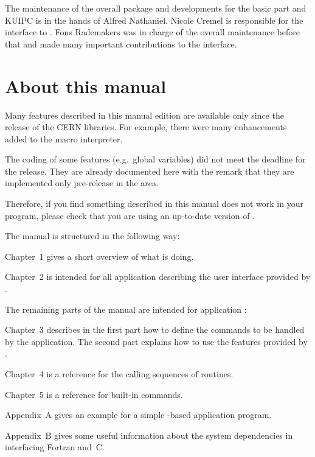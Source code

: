 The maintenance of the overall package and developments for the basic
part and KUIPC is in the hands of Alfred Nathaniel.
Nicole Cremel is responsible for the \KUIP{} interface to \OSFMotif{}.
Fons Rademakers was in charge of the overall maintenance before
that and made many important contributions to the \KUIPMotif{} interface.


\section*{About this manual}
 
Many features described in this manual edition are available only since the
 release of the CERN libraries.
For example, there were many enhancements added to the macro interpreter.

The coding of some features (e.g.\ global variables) did not meet the
deadline for the  release.  
They are already documented here with the remark that they are
implemented only  pre-release in the  area.

Therefore, if you find something described in this manual does not
work in your program, please check that you are using an up-to-date
version of \KUIP{}.

The manual is structured in the following way:
\begin{UL}
\item
Chapter~1 gives a short overview of what \KUIP{} is doing.
\item
Chapter~2 is intended for all application  describing
the user interface provided by \KUIP{}. 
\end{UL}
The remaining parts of the manual are intended for application
:
\begin{UL}
\item
Chapter~3 describes in the first part how to define the commands to be
handled by the application.
The second part explains how to use the features provided by \KUIPMotif{}.
\item
Chapter~4 is a reference for the calling sequences of \KUIP{}
routines.
\item
Chapter~5 is a reference for \KUIP{} built-in commands.
\item
Appendix~A gives an example for a simple \KUIP{}-based application program.
\item
Appendix~B gives some useful information about the system dependencies 
in interfacing Fortran and~C.
\end{UL}


